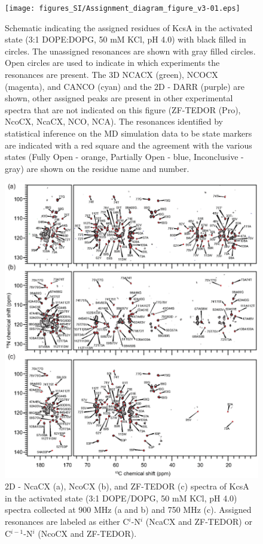 \documentclass[%
 aip,
 amsmath,amssymb,
 preprint,%
]{revtex4-1}
\begin{document}
\begin{figure}[tbp]
	\texttt{[image: figures\_SI/Assignment\_diagram\_figure\_v3-01.eps]}
	 \caption{\scriptsize
	 Schematic indicating the assigned residues of KcsA in the activated state (3:1 DOPE:DOPG, 50 mM KCl, pH 4.0) with black filled in circles. The unassigned resonances are shown with gray filled circles. Open circles are used to indicate in which experiments the resonances are present. The 3D NCACX (green), NCOCX (magenta), and CANCO (cyan) and the 2D - DARR (purple) are shown, other assigned peaks are present in other experimental spectra that are not indicated on this figure (ZF-TEDOR (Pro), NcoCX, NcaCX, NCO, NCA). The resonances identified by statistical inference on the MD simulation data to be state markers are indicated with a red square and the agreement with the various states (Fully Open - orange, Partially Open - blue, Inconclusive - gray) are shown on the residue name and number. 
}
\label{SI_NMR_assign_scheme}
\end{figure}

\begin{figure}[tbp]
	\includegraphics[width=\textwidth]{figures_SI/2Ds_all_v2-01.eps}
	 \caption{\scriptsize
	 2D - NcaCX (a), NcoCX (b), and ZF-TEDOR (c) spectra of KcsA in the activated state (3:1 DOPE/DOPG, 50 mM KCl, pH 4.0) spectra collected at 900 MHz (a and b) and 750 MHz (c). Assigned resonances are labeled as either C$^i$-N$^i$ (NcaCX and ZF-TEDOR) or C$^{i-1}$-N$^i$ (NcoCX and ZF-TEDOR).
}
\label{SI_NMR_full_2Ds}
\end{figure}
\end{document}

